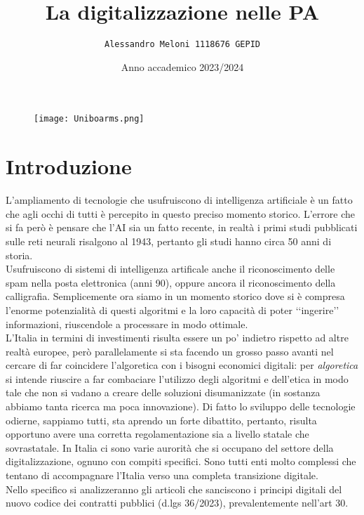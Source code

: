 \documentclass{article}
\title{\huge\textbf{La digitalizzazione nelle PA}}
\author{\texttt{Alessandro Meloni 1118676 GEPID}}
\date{Anno accademico 2023/2024}
\begin{document}
\begin{figure}
    \centering
    \texttt{[image: Uniboarms.png]}
\end{figure}
\maketitle

\centering \tableofcontents

\newpage\centering
\section{Introduzione}
\begin{justify}
L'ampliamento di tecnologie che usufruiscono di intelligenza artificiale è un fatto che agli occhi di tutti è percepito in questo preciso momento storico. L'errore che si fa però è pensare che l'AI sia un fatto recente, in realtà i primi studi pubblicati sulle reti neurali risalgono al 1943, pertanto gli studi hanno circa 50 anni di storia.\citep{mcculloch1943logical}\\ Usufruiscono di sistemi di intelligenza artificale anche il riconoscimento delle spam nella posta elettronica (anni 90), oppure ancora il riconoscimento della calligrafia. Semplicemente ora siamo in un momento storico dove si è compresa l'enorme potenzialità di questi algoritmi e la loro capacità di poter ‘‘ingerire’’ informazioni, riuscendole a processare in modo ottimale.\\
L'Italia in termini di investimenti risulta essere un po' indietro rispetto ad altre realtà europee, però parallelamente si sta facendo un grosso passo avanti nel cercare di far coincidere l'algoretica con i bisogni economici digitali: per \textit{algoretica} si intende riuscire a far combaciare l'utilizzo degli algoritmi e dell'etica in modo tale che non si vadano a creare delle soluzioni disumanizzate (in sostanza abbiamo tanta ricerca ma poca innovazione).
Di fatto lo sviluppo delle tecnologie odierne, sappiamo tutti, sta aprendo un forte dibattito, pertanto, risulta opportuno avere una corretta regolamentazione sia a livello statale che sovrastatale.
In Italia ci sono varie aurorità che si occupano del settore della digitalizzazione, ognuno con compiti specifici.
Sono tutti enti molto complessi che tentano di accompagnare l'Italia verso una completa transizione digitale.\\
Nello specifico si analizzeranno gli articoli che sanciscono i principi digitali del nuovo codice dei contratti pubblici (d.lgs 36/2023), prevalentemente nell'art 30.\\

\end{justify}
\end{document}
